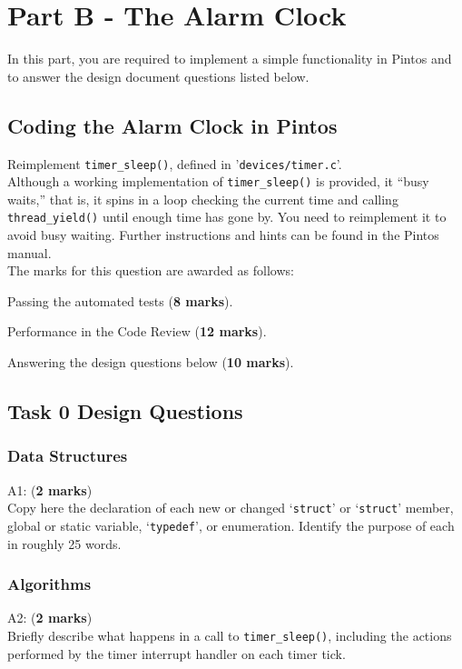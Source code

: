 \documentclass[a4paper,12pt]{article}
\newcommand{\shell}[1]{\lstinline!#1!}
\begin{document}
\section*{Part B - The Alarm Clock}

In this part, you are required to implement a simple functionality in Pintos and to answer the design document questions listed below.

\subsection*{Coding the Alarm Clock in Pintos} 
Reimplement \shell{timer_sleep()}, defined in '\shell{devices/timer.c}’.\\ 

\noindent Although a working implementation of \shell{timer_sleep()} is provided, it “busy waits,” that is, 
it spins in a loop checking the current time and calling \shell{thread_yield()} until enough time has gone by. 
You need to reimplement it to avoid busy waiting. 
Further instructions and hints can be found in the Pintos manual.\\

\noindent The marks for this question are awarded as follows:

Passing the automated tests ({\bf 8 marks}). 

Performance in the Code Review ({\bf 12 marks}). 

Answering the design questions below ({\bf 10 marks}).

\subsection*{Task 0 Design Questions}

\subsubsection*{Data Structures}
A1: ({\bf 2 marks}) \\
Copy here the declaration of each new or changed `\shell{struct}' or `\shell{struct}' member, 
global or static variable, `\shell{typedef}', or enumeration.
Identify the purpose of each in roughly 25 words.

\subsubsection*{Algorithms}
A2: ({\bf 2 marks}) \\
Briefly describe what happens in a call to \shell{timer_sleep()}, including the actions performed by the timer interrupt handler on each timer tick. \\
\end{document}
